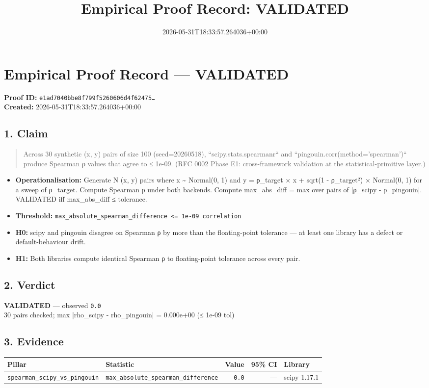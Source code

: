\documentclass{article}
\title{Empirical Proof Record: VALIDATED}
\date{2026-05-31T18:33:57.264036+00:00}
\begin{document}
\maketitle
\section*{Empirical Proof Record --- \textcolor{validated}{\textbf{VALIDATED}}}
\textbf{Proof ID:} \texttt{e1ad7040bbe8f799f5260606d4f62475\dots}\\
\textbf{Created:} 2026-05-31T18:33:57.264036+00:00
\subsection*{1. Claim}
\begin{quote}Across 30 synthetic (x, y) pairs of size 100 (seed=20260518), ``scipy.stats.spearmanr`` and ``pingouin.corr(method='spearman')`` produce Spearman ρ values that agree to ≤ 1e-09. (RFC 0002 Phase E1: cross-framework validation at the statistical-primitive layer.)\end{quote}
\begin{itemize}
\item \textbf{Operationalisation:} Generate N (x, y) pairs where x \textasciitilde{} Normal(0, 1) and y = ρ\_target × x + sqrt(1 - ρ\_target²) × Normal(0, 1) for a sweep of ρ\_target. Compute Spearman ρ under both backends. Compute max\_abs\_diff = max over pairs of |ρ\_scipy - ρ\_pingouin|. VALIDATED iff max\_abs\_diff ≤ tolerance.
\item \textbf{Threshold:} \texttt{max\_absolute\_spearman\_difference <= 1e-09 correlation}
\item \textbf{H0:} scipy and pingouin disagree on Spearman ρ by more than the floating-point tolerance — at least one library has a defect or default-behaviour drift.
\item \textbf{H1:} Both libraries compute identical Spearman ρ to floating-point tolerance across every pair.
\end{itemize}
\subsection*{2. Verdict}
\textcolor{validated}{\textbf{VALIDATED}} --- observed \texttt{0.0}\\
30 pairs checked; max |rho\_scipy - rho\_pingouin| = 0.000e+00 (≤ 1e-09 tol)
\subsection*{3. Evidence}
\begin{tabular}{llrrl}\toprule
\textbf{Pillar} & \textbf{Statistic} & \textbf{Value} & \textbf{95\% CI} & \textbf{Library} \\\midrule
\texttt{spearman\_scipy\_vs\_pingouin} & \texttt{max\_absolute\_spearman\_difference} & \texttt{0.0} & --- & scipy 1.17.1 \\
\bottomrule\end{tabular}
\end{document}
